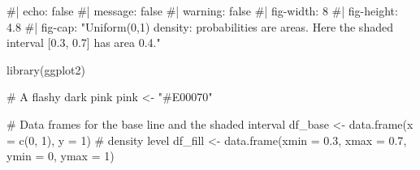 \documentclass[
  letterpaper,
  DIV=11,
  numbers=noendperiod]{scrreprt}
\newenvironment{Shaded}{\begin{snugshade}}{\end{snugshade}}
\newcommand{\AttributeTok}[1]{\textcolor[rgb]{0.40,0.45,0.13}{#1}}
\newcommand{\CommentTok}[1]{\textcolor[rgb]{0.37,0.37,0.37}{#1}}
\newcommand{\DecValTok}[1]{\textcolor[rgb]{0.68,0.00,0.00}{#1}}
\newcommand{\FloatTok}[1]{\textcolor[rgb]{0.68,0.00,0.00}{#1}}
\newcommand{\FunctionTok}[1]{\textcolor[rgb]{0.28,0.35,0.67}{#1}}
\newcommand{\NormalTok}[1]{\textcolor[rgb]{0.00,0.23,0.31}{#1}}
\newcommand{\OtherTok}[1]{\textcolor[rgb]{0.00,0.23,0.31}{#1}}
\newcommand{\StringTok}[1]{\textcolor[rgb]{0.13,0.47,0.30}{#1}}
\begin{document}
\begin{Shaded}
\begin{Highlighting}[]
\CommentTok{\#| echo: false}
\CommentTok{\#| message: false}
\CommentTok{\#| warning: false}
\CommentTok{\#| fig{-}width: 8}
\CommentTok{\#| fig{-}height: 4.8}
\CommentTok{\#| fig{-}cap: "Uniform(0,1) density: probabilities are areas. Here the shaded interval [0.3, 0.7] has area 0.4."}

\FunctionTok{library}\NormalTok{(ggplot2)}

\CommentTok{\# A flashy dark pink}
\NormalTok{pink }\OtherTok{\textless{}{-}} \StringTok{"\#E00070"}

\CommentTok{\# Data frames for the base line and the shaded interval}
\NormalTok{df\_base }\OtherTok{\textless{}{-}} \FunctionTok{data.frame}\NormalTok{(}\AttributeTok{x =} \FunctionTok{c}\NormalTok{(}\DecValTok{0}\NormalTok{, }\DecValTok{1}\NormalTok{), }\AttributeTok{y =} \DecValTok{1}\NormalTok{)   }\CommentTok{\# density level}
\NormalTok{df\_fill }\OtherTok{\textless{}{-}} \FunctionTok{data.frame}\NormalTok{(}\AttributeTok{xmin =} \FloatTok{0.3}\NormalTok{, }\AttributeTok{xmax =} \FloatTok{0.7}\NormalTok{, }\AttributeTok{ymin =} \DecValTok{0}\NormalTok{, }\AttributeTok{ymax =} \DecValTok{1}\NormalTok{)}


\end{Highlighting}
\end{Shaded}
\end{document}
